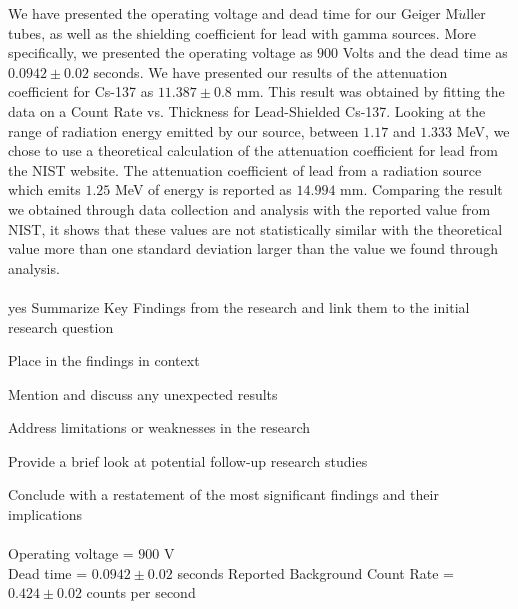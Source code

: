 We have presented the operating voltage and dead time for our Geiger M$\ddot{u}$ller tubes, as well as the shielding coefficient for lead with gamma sources. More specifically, we presented the operating voltage as $900$ Volts and the dead time as $0.0942 \pm 0.02$ seconds. We have presented our results of the attenuation coefficient for Cs-137 as $11.387 \pm 0.8$ mm. This result was obtained by fitting the data on a Count Rate vs. Thickness for Lead-Shielded Cs-137. Looking at the range of radiation energy emitted by our source, between $1.17$ and $1.333$ MeV, we chose to use a theoretical calculation of the attenuation coefficient for lead from the NIST website. The attenuation coefficient of lead from a radiation source which emits $1.25$ MeV of energy is reported as $14.994$ mm. Comparing the result we obtained through data collection and analysis with the reported value from NIST, it shows that these values are not statistically similar with the theoretical value more than one standard deviation larger than the value we found through analysis.
\\ \\
yes
Summarize Key Findings from the research and link them to the initial research question

Place in the findings in context

Mention and discuss any unexpected results

Address limitations or weaknesses in the research

Provide a brief look at potential follow-up research studies

Conclude with a restatement of the most significant findings and their implications
\\ \\
Operating voltage = $900$ V \\
Dead time = $0.0942 \pm 0.02$ seconds
Reported Background Count Rate  = $0.424 \pm 0.02$ counts per second \\ 